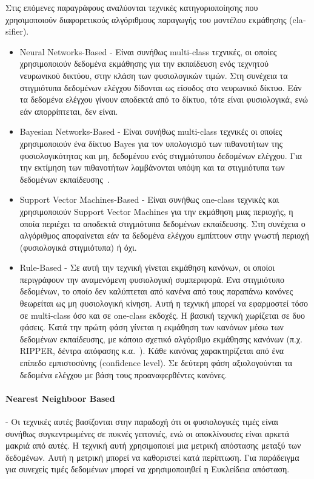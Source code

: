 \documentclass[12pt]{report}
\begin{document}
Στις επόμενες παραγράφους αναλύονται τεχνικές κατηγοριοποίησης που χρησιμοποιούν διαφορετικούς αλγόριθμους παραγωγής του μοντέλου εκμάθησης (\textlatin{clasifier}).
\begin{itemize}
	\item \textlatin{Neural Networks-Based} - Είναι συνήθως \textlatin{multi-class} τεχνικές, οι οποίες χρησιμοποιούν δεδομένα εκμάθησης για την εκπαίδευση ενός τεχνητού νευρωνικού δικτύου, στην κλάση των φυσιολογικών τιμών. Στη συνέχεια τα στιγμιότυπα δεδομένων ελέγχου δίδονται ως είσοδος στο νευρωνικό δίκτυο. Εάν τα δεδομένα ελέγχου γίνουν αποδεκτά από το δίκτυο, τότε είναι φυσιολογικά, ενώ εάν απορρίπτεται, δεν είναι.
	\item \textlatin{Bayesian Networks-Based} - Είναι συνήθως \textlatin{multi-class} τεχνικές οι οποίες χρησιμοποιούν ένα δίκτυο \textlatin{Bayes} για τον υπολογισμό των πιθανοτήτων της φυσιολογικότητας και μη, δεδομένου ενός στιγμιότυπου δεδομένων ελέγχου. Για την εκτίμηση των πιθανοτήτων λαμβάνονται υπόψη και τα στιγμιότυπα των δεδομένων εκπαίδευσης~\cite{paper:14}.
	\item \textlatin{Support Vector Machines-Based} - Είναι συνήθως \textlatin{one-class} τεχνικές και χρησιμοποιούν \textlatin{Support Vector Machines} για την εκμάθηση μιας περιοχής, η οποία περιέχει τα αποδεκτά στιγμιότυπα δεδομένων εκπαίδευσης. Στη συνέχεια ο αλγόριθμος αποφαίνεται εάν τα δεδομένα ελέγχου εμπίπτουν στην γνωστή περιοχή (φυσιολογικά στιγμιότυπα) ή όχι.
	\item \textlatin{Rule-Based} - Σε αυτή την τεχνική γίνεται εκμάθηση κανόνων, οι οποίοι περιγράφουν την αναμενόμενη φυσιολογική συμπεριφορά. Ένα στιγμιότυπο δεδομένων, το οποίο δεν καλύπτεται από κανένα από τους παραπάνω κανόνες θεωρείται ως μη φυσιολογική κίνηση. Αυτή η τεχνική μπορεί να εφαρμοστεί τόσο σε \textlatin{multi-class} όσο και σε \textlatin{one-class} εκδοχές. Η βασική τεχνική χωρίζεται σε δυο φάσεις. Κατά την πρώτη φάση γίνεται η εκμάθηση των κανόνων μέσω των δεδομένων εκπαίδευσης, με κάποιο σχετικό αλγόριθμο εκμάθησης κανόνων (π.χ. \textlatin{RIPPER}, δέντρα απόφασης κ.α.~\cite{paper:14}). Κάθε κανόνας χαρακτηρίζεται από ένα επίπεδο εμπιστοσύνης (\textlatin{confidence level}). Σε δεύτερη φάση αξιολογούνται τα δεδομένα ελέγχου με βάση τους προαναφερθέντες κανόνες.
\end{itemize}

\paragraph{\textlatin{Nearest Neighboor Based}} - Οι τεχνικές αυτές βασίζονται στην παραδοχή ότι οι φυσιολογικές τιμές είναι συνήθως συγκεντρωμένες σε πυκνές γειτονιές, ενώ οι αποκλίνουσες είναι αρκετά μακριά από αυτές. Η τεχνική αυτή χρησιμοποιεί μια μετρική απόστασης μεταξύ των δεδομένων. Αυτή η μετρική μπορεί να καθοριστεί κατά περίπτωση. Για παράδειγμα για συνεχείς τιμές δεδομένων μπορεί να χρησιμοποιηθεί η Ευκλείδεια απόσταση.
\end{document}
